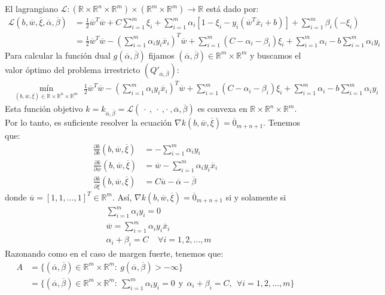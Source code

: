 \documentclass[11pt]{article}
\newcommand{\R}{\mathbb{R}}
\newcommand{\Rn}{\R^{n}}
\newcommand{\Rm}{\R^{m}}
\newcommand{\Rnu}{\R\times\Rn}
\newcommand{\Runm}{\R\times\Rn\times\Rm}
\newcommand{\xiv}{\overline{\xi}}
\newcommand{\uv}{\overline{u}}
\newcommand{\av}{\overline{\alpha}}
\newcommand{\bev}{\overline{\beta}}
\newcommand{\wv}{\overline{w}}
\newcommand{\x}{\overline{x}}
\newcommand{\Sm}{1,2,\ldots, m}
\newcommand{\La}{\mathcal{L}}
\newcommand{\ali}{\alpha_{i}}
\newcommand{\bei}{\beta_{i}}
\newcommand{\xii}{\xi_{i}}
\begin{document}
El lagrangiano $\La:(\R\times\Rn\times\Rm)\times(\Rm\times\Rm)\rightarrow\R$ está dado por:
\begin{equation*}
\begin{aligned}
\La(b, \wv, \xiv, \av, \bev)&=\frac{1}{2}\wv^{T}\wv+C\sum_{i=1}^{m}\xii+\sum_{i=1}^{m}\ali[1-\xii-y_{i}(\wv^{T}\x_{i}+b)]+\sum_{i=1}^{m}\bei(-\xii)\\
&=\frac{1}{2}\wv^{T}\wv-\left(\sum_{i=1}^{m}\ali y_{i}\x_{i}\right)^{T}\wv+\sum_{i=1}^{m}(C-\ali-\bei)\xii+\sum_{i=1}^{m}\ali-b\sum_{i=1}^{m}\ali y_{i}
\end{aligned}
\end{equation*}
Para calcular la función dual $g(\av, \bev)$ fijamos $(\av, \bev)\in\Rm\times\Rm$ y buscamos el valor óptimo del problema irrestricto $(Q'_{\av, \bev})$:
\begin{equation*}
\begin{aligned}
& \underset{(b, \wv, \xiv)\in \Rnu\times\Rm}{\text{mín}}\ \ \ \frac{1}{2}\wv^{T}\wv-\left(\sum_{i=1}^{m}\ali y_{i}\x_{i}\right)^{T}\wv+\sum_{i=1}^{m}(C-\ali-\bei)\xii+\sum_{i=1}^{m}\ali-b\sum_{i=1}^{m}\ali y_{i}
\end{aligned}
\end{equation*}
Esta función objetivo $k=k_{\av,\bev}=\La(\ \cdot\ ,\ \cdot\ ,\cdot\ , \av, \bev)$ es convexa en $\Runm$. Por lo tanto, es suficiente resolver la ecuación $\nabla k(b, \wv, \xiv)=\overline{0}_{m+n+1}$. Tenemos que:
\begin{equation*}
\begin{aligned}
\frac{\partial k}{\partial b}(b, \wv, \xiv)&=-\sum_{i=1}^{m}\ali y_{i}\\
\frac{\partial k}{\partial \wv}(b, \wv, \xiv)&=\wv-\sum_{i=1}^{m}\ali y_{i}\x_{i}\\
\frac{\partial k}{\partial \xiv}(b, \wv, \xiv)&=C\uv-\av-\bev
\end{aligned}
\end{equation*}
donde $\uv=[1, 1,\ldots, 1]^{T}\in\Rm$. Así, $\nabla k(b, \wv, \xiv)=\overline{0}_{m+n+1}$ si y solamente si
\begin{equation*}
\begin{aligned}
&\sum_{i=1}^{m}\ali y_{i}=0\\
&\wv=\sum_{i=1}^{m}\ali y_{i}\x_{i}\\
&\ali+\bei=C\ \ \ \ \ \forall i=\Sm
\end{aligned}
\end{equation*}
Razonando como en el caso de margen fuerte, tenemos que:
\begin{equation*}
\begin{aligned}
A&=\{(\av, \bev)\in\Rm\times\Rm:\ g(\av, \bev)>-\infty\}\\
&=\{(\av, \bev)\in\Rm\times\Rm:\ \sum_{i=1}^{m}\ali y_{i}=0\ \ \text{y}\ \ \ali+\bei=C,\ \ \forall i=\Sm\}
\end{aligned}
\end{equation*}
\end{document}
